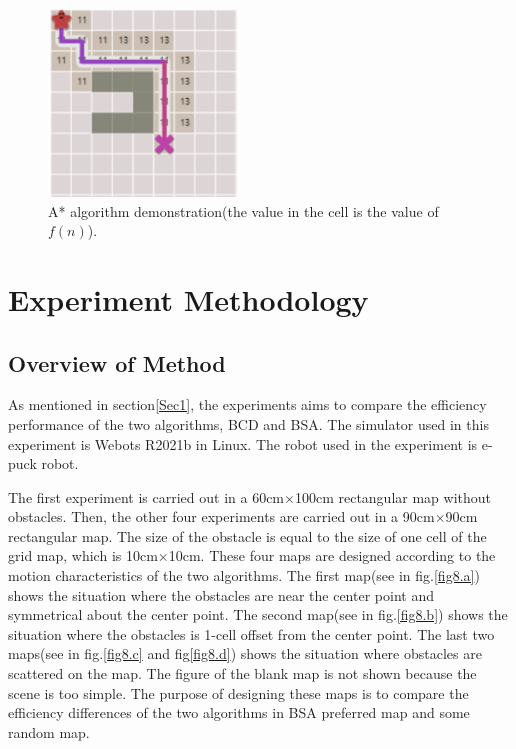 \documentclass[conference]{IEEEtran}
\begin{document}
\setlength{\belowcaptionskip}{-1cm}
\begin{figure}[htbp]
\centerline{\includegraphics[width=5cm,height=5cm]{RS_Report/astar.png}}
\caption{A* algorithm demonstration(the value in the cell is the value of $f(n)$).}
\label{fig4}
\end{figure}

\section{Experiment Methodology}

\subsection{Overview of Method}
As mentioned in section\ref{Sec1}, the experiments aims to compare the efficiency performance of the two algorithms, BCD and BSA. The simulator used in this experiment is Webots R2021b in Linux. The robot used in the experiment is e-puck robot\cite{Cyberboticswebsite}.

The first experiment is carried out in a 60cm$\times$100cm rectangular map without obstacles. Then, the other four experiments are carried out in a 90cm$\times$90cm rectangular map. The size of the obstacle is equal to the size of one cell of the grid map, which is 10cm$\times$10cm. These four maps are designed according to the motion characteristics of the two algorithms. The first map(see in fig.\ref{fig8.a}) shows the situation where the obstacles are near the center point and symmetrical about the center point. The second map(see in fig.\ref{fig8.b}) shows the situation where the obstacles is 1-cell offset from the center point. The last two maps(see in fig.\ref{fig8.c} and fig\ref{fig8.d}) shows the situation where obstacles are scattered on the map. The figure of the blank map is not shown because the scene is too simple. The purpose of designing these maps is to compare the efficiency differences of the two algorithms in BSA preferred map and some random map.
\end{document}
